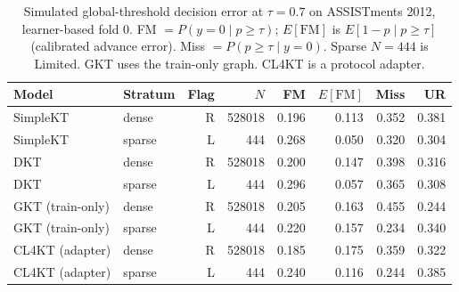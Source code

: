 \begin{table}[htbp]
\caption{Simulated global-threshold decision error at $\tau=0.7$ on ASSISTments 2012, learner-based fold 0. FM $=P(y=0\mid p\ge\tau)$; $E[\mathrm{FM}]$ is $E[1-p\mid p\ge\tau]$ (calibrated advance error). Miss $=P(p\ge\tau\mid y=0)$. Sparse $N=444$ is Limited. GKT uses the train-only graph. CL4KT is a protocol adapter.}
\label{tab:c_tau07}
\centering
\footnotesize
\begin{tabular}{llrrrrrr}
\toprule
Model & Stratum & Flag & $N$ & FM & $E[\mathrm{FM}]$ & Miss & UR \\
\midrule
SimpleKT & dense & R & 528018 & 0.196 & 0.113 & 0.352 & 0.381 \\
SimpleKT & sparse & L & 444 & 0.268 & 0.050 & 0.320 & 0.304 \\
\midrule
DKT & dense & R & 528018 & 0.200 & 0.147 & 0.398 & 0.316 \\
DKT & sparse & L & 444 & 0.296 & 0.057 & 0.365 & 0.308 \\
\midrule
GKT (train-only) & dense & R & 528018 & 0.205 & 0.163 & 0.455 & 0.244 \\
GKT (train-only) & sparse & L & 444 & 0.220 & 0.157 & 0.234 & 0.340 \\
\midrule
CL4KT (adapter) & dense & R & 528018 & 0.185 & 0.175 & 0.359 & 0.322 \\
CL4KT (adapter) & sparse & L & 444 & 0.240 & 0.116 & 0.244 & 0.385 \\
\bottomrule
\end{tabular}
\end{table}
